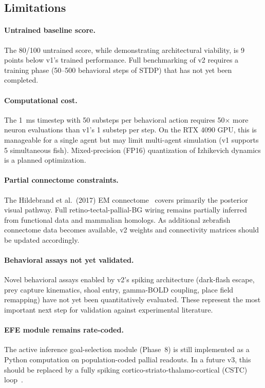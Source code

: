 \documentclass[11pt,a4paper]{article}
\begin{document}
\subsection{Limitations}\label{sec:limitations}

\paragraph{Untrained baseline score.}
The 80/100 untrained score, while demonstrating architectural viability,
is 9 points below v1's trained performance.
Full benchmarking of v2 requires a training phase (50--500 behavioral
steps of STDP) that has not yet been completed.

\paragraph{Computational cost.}
The 1~ms timestep with 50 substeps per behavioral action requires
50$\times$ more neuron evaluations than v1's 1 substep per step.
On the RTX 4090 GPU, this is manageable for a single agent but may
limit multi-agent simulation (v1 supports 5 simultaneous fish).
Mixed-precision (FP16) quantization of Izhikevich dynamics is a
planned optimization.

\paragraph{Partial connectome constraints.}
The Hildebrand et al.\ (2017) EM connectome~\cite{hildebrand2017}
covers primarily the posterior visual pathway.
Full retino-tectal-pallial-BG wiring remains partially inferred from
functional data and mammalian homologs.
As additional zebrafish connectome data becomes available, v2 weights
and connectivity matrices should be updated accordingly.

\paragraph{Behavioral assays not yet validated.}
Novel behavioral assays enabled by v2's spiking architecture (dark-flash
escape, prey capture kinematics, shoal entry, gamma-BOLD coupling,
place field remapping) have not yet been quantitatively evaluated.
These represent the most important next step for validation against
experimental literature.

\paragraph{EFE module remains rate-coded.}
The active inference goal-selection module (Phase~8) is still
implemented as a Python computation on population-coded pallial
readouts.
In a future v3, this should be replaced by a fully spiking
cortico-striato-thalamo-cortical (CSTC) loop~\cite{redgrave1999}.
\end{document}
